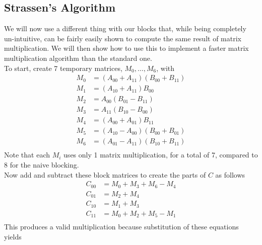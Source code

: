 \documentclass{article}         %
\begin{document}
\subsection*{Strassen's Algorithm}
We will now use a different thing with our blocks that, while being completely un-intuitive, can be fairly easily shown to compute the same result of matrix multiplication. We will then show how to use this to implement a faster matrix multiplication algorithm than the standard one.\\
To start,  create 7 temporary matrices, $M_0,\dots, M_6$, with
\begin{equation}
\begin{split}
M_0&=(A_{00}+A_{11})(B_{00}+B_{11})\\
M_1&=(A_{10}+A_{11})B_{00}\\
M_2&=A_{00}(B_{01}-B_{11})\\
M_3&=A_{11}(B_{10}-B_{00})\\
M_4&=(A_{00}+A_{01})B_{11}\\
M_5&=(A_{10}-A_{00})(B_{00}+B_{01})\\
M_6&=(A_{01}-A_{11})(B_{10}+B_{11})\\
\end{split}
\end{equation}
Note that each $M_i$ uses only 1 matrix multiplication, for a total of 7, compared to 8 for the naive blocking.\\
Now add and subtract these block matrices to create the parts of $C$ as follows
\begin{equation}
\begin{split}
C_{00}&=M_0+M_3+M_6-M_4\\
C_{01}&=M_2+M_4\\
C_{10}&=M_1+M_3\\
C_{11}&=M_0+M_2+M_5-M_1\\
\end{split}
\end{equation}
This produces a valid multiplication because substitution of these equations yields
\end{document}
